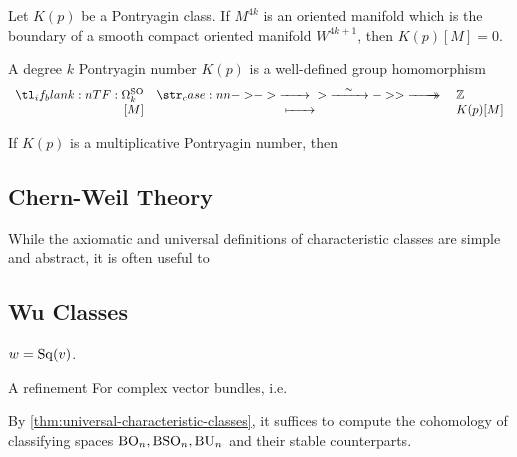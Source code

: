 \begin{proposition}\label{prop:pontryagin-}
	Let $K(p)$ be a Pontryagin class. If $M^{4k}$ is an oriented manifold which is the boundary of a smooth compact oriented manifold $W^{4k+1}$, then $K(p)[M]=0$.
\end{proposition}

\begin{corollary}
	A degree $k$ Pontryagin number $K(p)$ is a well-defined group homomorphism
	\[
		\lkxfunc{}{\Omega^\SO_k}{\Z}{[M]}{K(p)[M]}
	\]
\end{corollary}

\begin{corollary}
	If $K(p)$ is a multiplicative Pontryagin number, then
\end{corollary}

\subsection{Chern-Weil Theory}\label{sec:chern-weil-theory}

While the axiomatic and universal definitions of characteristic classes are simple and abstract, it is often useful to

\subsection{Wu Classes}\label{sec:wu-classes}

\begin{theorem}
	$w=\operatorname{Sq}(v)$.
\end{theorem}

A refinement
For complex vector bundles, i.e.

By \cref{thm:universal-characteristic-classes}, it suffices to compute the cohomology of classifying spaces $\mathrm{BO}_n, \mathrm{BSO}_n, \mathrm{BU}_n$ and their stable counterparts.

